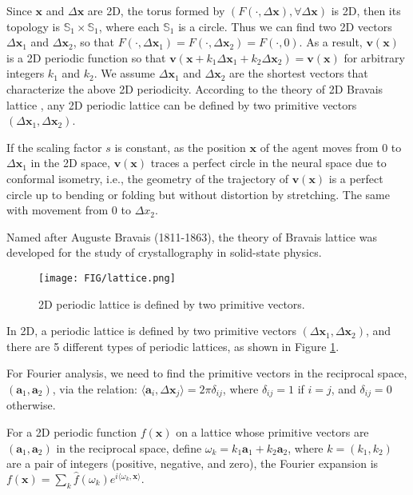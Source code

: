 \documentclass{article}
\def\va{{\bm{a}}}
\def\vv{{\bm{v}}}
\def\vx{{\bm{x}}}
\def\evx{{x}}
\begin{document}
Since $\vx$ and $\Delta \vx$ are 2D,  the torus formed by $(F(\cdot, {\Delta \vx}), \forall \Delta \vx)$ is 2D, then its topology is $\mathbb{S}_1 \times \mathbb{S}_1$, where each $\mathbb{S}_1$ is a circle.  Thus we can find two 2D vectors $\Delta \vx_1$ and $\Delta \vx_2$, so that $F(\cdot, \Delta \vx_1) = F(\cdot, \Delta \vx_2) = F(\cdot, 0)$. As a result, $\vv(\vx)$ is a {2D periodic function} so that $\vv(\vx + k_1 \Delta \vx_1 + k_2 \Delta \vx_2) = \vv(\vx)$ for arbitrary integers $k_1$ and $k_2$. We assume $\Delta \vx_1$ and $\Delta \vx_2$ are the shortest vectors that characterize the above 2D periodicity. According to the theory of 2D Bravais lattice \citep{ashcroft1976solid}, any 2D periodic lattice can be defined by two primitive vectors $(\Delta \vx_1, \Delta \vx_2)$. 

If the scaling factor $s$ is constant, as the position $\vx$ of the agent moves from 0 to $\Delta \vx_1$ in the 2D space, $\vv(\vx)$ traces a perfect circle in the neural space due to conformal isometry, i.e., the geometry of the trajectory of $\vv(\vx)$ is a perfect circle up to bending or folding but without distortion by stretching. The same with movement from 0 to $\Delta \evx_2$. 

Named after Auguste Bravais (1811-1863), the theory of Bravais lattice was developed for the study of crystallography in solid-state physics. 

\begin{figure}[h]
	\centering	
	\texttt{[image: FIG/lattice.png]}
		\caption{\small 2D periodic lattice is defined by two primitive vectors.  }	
	\label{fig:B}
\end{figure}

In 2D, a periodic lattice is defined by two primitive vectors $(\Delta \vx_1, \Delta \vx_2)$, and there are 5 different types of periodic lattices, as shown in Figure \ref{fig:B}. 

For Fourier analysis, we need to find the primitive vectors in the reciprocal space, $(\va_1, \va_2)$, via the relation: $\langle \va_i, \Delta \vx_j\rangle = 2\pi \delta_{ij}$, where $\delta_{ij} = 1$ if $i = j$, and $\delta_{ij} = 0$ otherwise. 

For a 2D periodic function $f(\vx)$ on a lattice whose primitive vectors are $(\va_1, \va_2)$ in the reciprocal space, define $\omega_k = k_1 \va_1 + k_2 \va_2$, where $k = (k_1, k_2)$ are a pair of integers (positive, negative, and zero), the Fourier expansion is $f(\vx) = \sum_k \hat{f}(\omega_k) e^{i \langle \omega_k, \vx\rangle}. $
\end{document}
